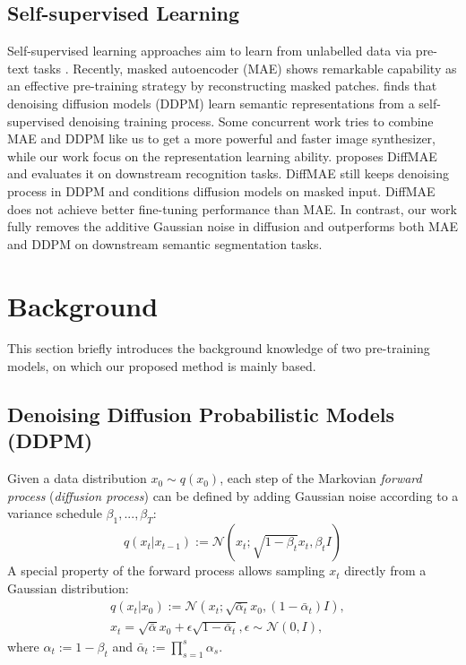 \documentclass{article} \usepackage{iclr2024_conference,times}
\begin{document}
\subsection{Self-supervised Learning}
Self-supervised learning approaches aim to learn from unlabelled data via pre-text tasks \citep{DBLP:conf/iccv/DoerschGE15,DBLP:conf/iccv/WangG15,DBLP:conf/cvpr/PathakGDDH17,DBLP:conf/iclr/GidarisSK18}. Recently, masked autoencoder (MAE) \citep{DBLP:conf/cvpr/HeCXLDG22} shows remarkable capability as an effective pre-training strategy by reconstructing masked patches. \citet{DBLP:conf/iclr/BaranchukVRKB22} finds that denoising diffusion models (DDPM) learn semantic representations from a self-supervised denoising training process. Some concurrent work \citep{lei2023masked} tries to combine MAE and DDPM like us to get a more powerful and faster image synthesizer, while our work focus on the representation learning ability. \citet{wei2023diffusion} proposes DiffMAE and evaluates it on downstream recognition tasks. DiffMAE still keeps denoising process in DDPM and conditions diffusion models on masked input. DiffMAE does not achieve better fine-tuning performance than MAE. In contrast, our work fully removes the additive Gaussian noise in diffusion and outperforms both MAE and DDPM on downstream semantic segmentation tasks.

\section{Background}
This section briefly introduces the background knowledge of two pre-training models, on which our proposed method is mainly based. 

\subsection{Denoising Diffusion Probabilistic Models (DDPM)}

Given a data distribution $x_{0} \sim q(x_{0})$, each step of the Markovian \emph{forward process} (\emph{diffusion process}) can be defined by adding Gaussian noise according to a variance schedule $\beta_{1}, ... , \beta_{T}$:
\begin{equation}
    q(x_{t}|x_{t-1}) := \mathcal N(x_{t}; \sqrt{1 - \beta_{t}}x_{t}, \beta_{t}I) \nonumber
\end{equation}
A special property of the forward process allows sampling $x_{t}$ directly from a Gaussian distribution:
\begin{equation}
    \begin{split}
    q(x_{t}|x_{0}) := \mathcal N(x_{t}; \sqrt{\bar{\alpha}_{t}}x_{0}, (1-\bar{\alpha}_{t})I),&\\
    x_{t} = \sqrt{\bar{\alpha}}x_{0} + \epsilon\sqrt{1-\bar{\alpha}_{t}}, \epsilon \sim \mathcal N(0, I),& \label{diffusion}
    \end{split}
\end{equation}
where $\alpha_{t}:=1-\beta_{t}$ and $\bar{\alpha}_{t}:=\prod_{s=1}^{s}\alpha_{s}$.
\end{document}
